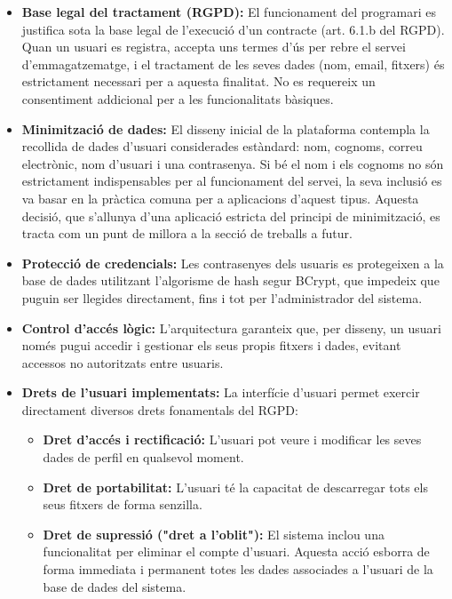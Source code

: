 \begin{itemize}
    \item \textbf{Base legal del tractament (RGPD):} El funcionament del programari es justifica sota la base legal de l'execució d'un contracte (art. 6.1.b del RGPD). Quan un usuari es registra, accepta uns termes d'ús per rebre el servei d'emmagatzematge, i el tractament de les seves dades (nom, email, fitxers) és estrictament necessari per a aquesta finalitat. No es requereix un consentiment addicional per a les funcionalitats bàsiques.

    \item \textbf{Minimització de dades:} El disseny inicial de la plataforma contempla la recollida de dades d'usuari considerades estàndard: nom, cognoms, correu electrònic, nom d'usuari i una contrasenya. Si bé el nom i els cognoms no són estrictament indispensables per al funcionament del servei, la seva inclusió es va basar en la pràctica comuna per a aplicacions d'aquest tipus. Aquesta decisió, que s'allunya d'una aplicació estricta del principi de minimització, es tracta com un punt de millora a la secció de treballs a futur.

    \item \textbf{Protecció de credencials:} Les contrasenyes dels usuaris es protegeixen a la base de dades utilitzant l'algorisme de hash segur BCrypt, que impedeix que puguin ser llegides directament, fins i tot per l'administrador del sistema.

    \item \textbf{Control d'accés lògic:} L'arquitectura garanteix que, per disseny, un usuari només pugui accedir i gestionar els seus propis fitxers i dades, evitant accessos no autoritzats entre usuaris.

    \item \textbf{Drets de l'usuari implementats:} La interfície d'usuari permet exercir directament diversos drets fonamentals del RGPD:
    \begin{itemize}
        \item \textbf{Dret d'accés i rectificació:} L'usuari pot veure i modificar les seves dades de perfil en qualsevol moment.
        \item \textbf{Dret de portabilitat:} L'usuari té la capacitat de descarregar tots els seus fitxers de forma senzilla.
        \item \textbf{Dret de supressió ("dret a l'oblit"):} El sistema inclou una funcionalitat per eliminar el compte d'usuari. Aquesta acció esborra de forma immediata i permanent totes les dades associades a l'usuari de la base de dades del sistema.
    \end{itemize}
\end{itemize}

